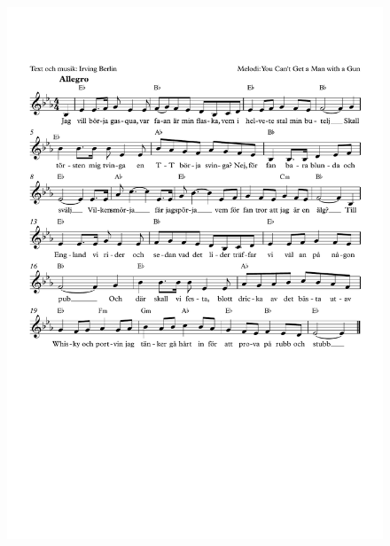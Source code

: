 \documentclass[a6paper,11pt]{article}
\begin{document}
\setlength{\oddsidemargin}{-0.67in}
\begin{center}
\end{center}
\vspace{-40pt}
\begin{figure}[!h]
\centering
\includegraphics[width=\textwidth]{porthos}
\end{figure}
\end{document}
